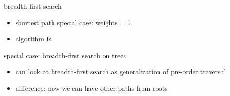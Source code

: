 \usetikzlibrary{graphs,graphs.standard,graphdrawing,quotes}

\begin{frame}{breadth-first search}
\begin{itemize}
\item shortest path special case: weights = 1
\item algorithm is 
\end{itemize}
\end{frame}

\begin{frame}{special case: breadth-first search on trees}
\begin{itemize}
\item can look at breadth-first search as generalization of pre-order traversal
\item difference: now we can have other paths from roots
\end{itemize}
\end{frame}

